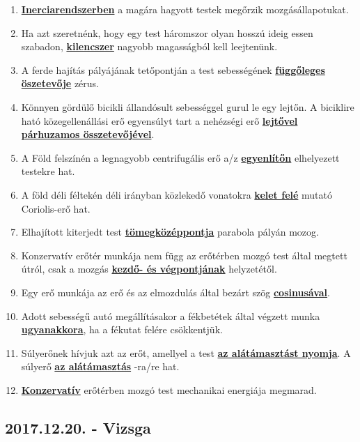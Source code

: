 \documentclass[../../fizika_kerdesek.tex]{subfiles}
\begin{document}
        \begin{enumerate}
            \item \underline{\textbf{Inerciarendszerben}} a magára hagyott testek megőrzik mozgásállapotukat. 
            \item Ha azt szeretnénk, hogy egy test háromszor olyan hosszú ideig essen szabadon, \underline{\textbf{kilencszer}} nagyobb magasságból kell leejtenünk.
            \item A ferde hajítás pályájának tetőpontján a test sebességének \underline{\textbf{függőleges öszetevője}} zérus.
            \item Könnyen gördülő bicikli állandósult sebességgel gurul le egy lejtőn. A biciklire ható közegellenállási erő egyensúlyt tart a nehézségi erő \underline{\textbf{lejtővel párhuzamos összetevőjével}}.
            \item A Föld felszínén a legnagyobb centrifugális erő a/z \underline{\textbf{egyenlítőn}} elhelyezett testekre hat.
            \item A föld déli féltekén déli irányban közlekedő vonatokra \underline{\textbf{kelet felé}} mutató Coriolis-erő hat.
            \item Elhajított kiterjedt test \underline{\textbf{tömegközéppontja}} parabola pályán mozog.
            \item Konzervatív erőtér munkája nem függ az erőtérben mozgó test által megtett útról, csak a mozgás \underline{\textbf{kezdő- és végpontjának}} helyzetétől.
            \item Egy erő munkája az erő és az elmozdulás által bezárt szög \underline{\textbf{cosinusával}}.
            \item Adott sebességű autó megállításakor a fékbetétek által végzett munka \underline{\textbf{ugyanakkora}}, ha a fékutat felére csökkentjük.
            \item Súlyerőnek hívjuk azt az erőt, amellyel a test \underline{\textbf{az alátámasztást nyomja}}. A súlyerő \underline{\textbf{az alátámasztás}} -ra/re hat.
            \item \underline{\textbf{Konzervatív}} erőtérben mozgó test mechanikai energiája megmarad.
        \end{enumerate}

    \subsection{2017.12.20. - Vizsga}
\end{document}
